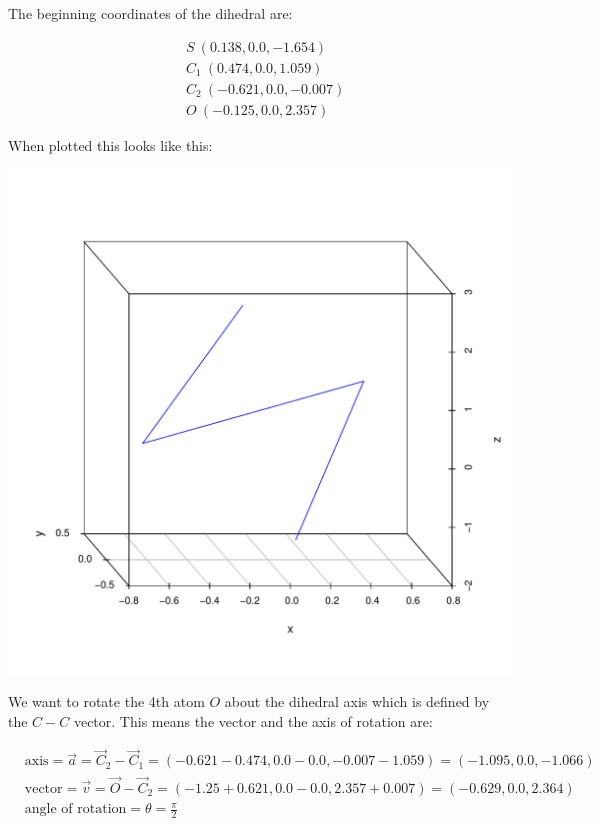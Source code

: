 \documentclass{article}\usepackage[]{graphicx}\usepackage[]{color}
\makeatletter
\def\maxwidth{ %
  \ifdim\Gin@nat@width>\linewidth
    \linewidth
  \else
    \Gin@nat@width
  \fi
}
\newenvironment{knitrout}{}{} %
\makeatother
\begin{document}
The beginning coordinates of the dihedral are:

\begin{align*}
  &S\ (0.138,0.0,-1.654)\\
  &C_1\ (0.474, 0.0, 1.059)\\
  &C_2\ (-0.621, 0.0, -0.007)\\
  &O\ (-0.125, 0.0, 2.357)
\end{align*}

When plotted this looks like this:

\begin{knitrout}
\color{fgcolor}
\includegraphics[width=\maxwidth]{figure/starting-dihedral-1} 

\end{knitrout}

We want to rotate the 4th atom $O$ about the dihedral axis which is defined by the $C-C$ vector.  This means the vector and the axis of rotation are:

\begin{align*}
  &\text{axis} = \vec{a} = \vec{C}_2-\vec{C}_1 = (-0.621-0.474,0.0-0.0,-0.007-1.059)=(-1.095,0.0,-1.066)\\
  &\text{vector} = \vec{v} = \vec{O}-\vec{C}_2 = (-1.25+0.621,0.0-0.0,2.357+0.007)=(-0.629,0.0,2.364)\\
  &\text{angle of rotation} = \theta = \frac{\pi}{2}
\end{align*}
\end{document}
